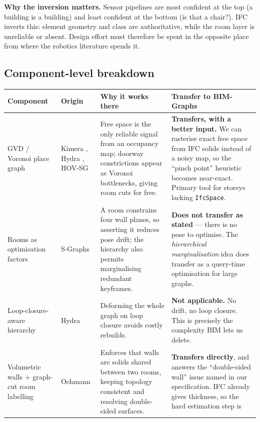 \documentclass[10pt,twocolumn,letterpaper]{article}
\begin{document}
\noindent\textbf{Why the inversion matters.} Sensor pipelines are most confident
at the top (a building is a building) and least confident at the bottom (is that
a chair?). IFC inverts this: element geometry and class are authoritative, while
the room layer is unreliable or absent. Design effort must therefore be spent in
the opposite place from where the robotics literature spends it.

\subsection{Component-level breakdown}

\begingroup
\centering
\small
\begin{tabular}{p{2.45cm} p{3.5cm} p{4.6cm} p{4.6cm}}
\toprule
\textbf{Component} & \textbf{Origin} & \textbf{Why it works there} & \textbf{Transfer to BIM-Graphs} \\
\midrule
GVD / Voronoi place graph &
Kimera \cite{rosinol2021kimera}, Hydra \cite{hughes2022hydra}, HOV-SG \cite{werby2024hovsg} &
Free space is the only reliable signal from an occupancy map; doorway
constrictions appear as Voronoi bottlenecks, giving room cuts for free. &
\textbf{Transfers, with a better input.} We can rasterise exact free space from
IFC solids instead of a noisy map, so the ``pinch point'' heuristic becomes
near-exact. Primary tool for storeys lacking \texttt{IfcSpace}. \\
\addlinespace
Rooms as optimisation factors &
S-Graphs \cite{bavle2022sgraphsplus,bavle2025sgraphs2} &
A room constrains four wall planes, so asserting it reduces pose drift; the
hierarchy also permits marginalising redundant keyframes. &
\textbf{Does not transfer as stated} --- there is no pose to optimise. The
\emph{hierarchical marginalisation} idea does transfer as a query-time
optimisation for large graphs. \\
\addlinespace
Loop-closure-aware hierarchy &
Hydra \cite{hughes2022hydra} &
Deforming the whole graph on loop closure avoids costly rebuilds. &
\textbf{Not applicable.} No drift, no loop closure. This is precisely the
complexity BIM lets us delete. \\
\addlinespace
Volumetric walls + graph-cut room labelling &
Ochmann \cite{ochmann2016parametric} &
Enforces that walls are solids shared between two rooms, keeping topology
consistent and resolving double-sided surfaces. &
\textbf{Transfers directly}, and answers the ``double-sided wall'' issue named in
our specification. IFC already gives thickness, so the hard estimation step is

\end{tabular}
\end{document}

